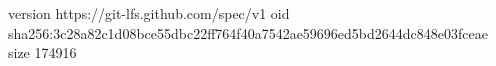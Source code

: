 version https://git-lfs.github.com/spec/v1
oid sha256:3c28a82c1d08bce55dbc22ff764f40a7542ae59696ed5bd2644dc848e03fceae
size 174916
